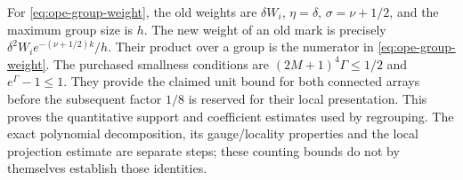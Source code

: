 For \eqref{eq:ope-group-weight}, the old weights are $\delta W_i$,
$\eta=\delta$, $\sigma=\nu+1/2$, and the maximum group size is $h$.
The new weight of an old mark is precisely
$\delta^2W_i e^{-(\nu+1/2)k}/h$.
Their product over a group is the numerator in
\eqref{eq:ope-group-weight}. The purchased smallness conditions are
$(2M+1)^4\Gamma\leq1/2$ and $e^\Gamma-1\leq1$.
They provide the claimed unit bound for both connected arrays before
the subsequent factor $1/8$ is reserved for their local presentation.
This proves the quantitative support and coefficient estimates used
by regrouping. The exact polynomial decomposition, its gauge/locality
properties and the local projection estimate are separate steps;
these counting bounds do not by themselves establish those identities.
